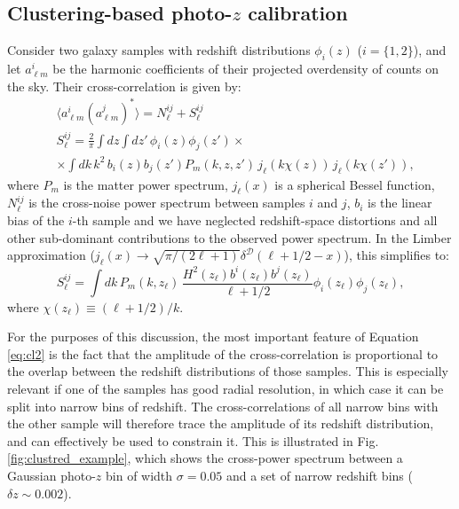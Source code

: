 \documentclass[prd,twocolumn]{revtex4}
\begin{document}
  \subsection{Clustering-based photo-$z$ calibration}\label{ssec:method.clustred}
    Consider two galaxy samples with redshift distributions $\phi_i(z)$ ($i=\{1,2\}$),
    and let $a^i_{\ell m}$ be the harmonic coefficients of their projected overdensity
    of counts on the sky. Their cross-correlation is given by:
    \begin{align}
      &\langle a^i_{\ell m}(a^j_{\ell m})^*\rangle=N^{ij}_\ell+S^{ij}_\ell\\\label{eq:cl1}
      &S^{ij}_\ell=\frac{2}{\pi}\int dz \int dz'\,\phi_i(z)\phi_j(z')\times\\\nonumber
      &\times\int dk\,k^2\,b_i(z)b_j(z')P_m(k,z,z')\,j_\ell(k\chi(z))\,j_\ell(k\chi(z')),
    \end{align}
    where $P_m$ is the matter power spectrum, $j_\ell(x)$ is a spherical Bessel function,
    $N^{ij}_\ell$ is the cross-noise power spectrum between samples $i$ and $j$, $b_i$
    is the linear bias of the $i$-th sample and we have neglected redshift-space distortions
    and all other sub-dominant contributions to the observed power spectrum. In the Limber
    approximation ($j_\ell(x)\rightarrow\sqrt{\pi/(2\ell+1)}\delta^\mathcal{D}(\ell+1/2-x)$),
    this simplifies to:
    \begin{equation}\label{eq:cl2}
      S^{ij}_\ell=\int dk\,P_m(k,z_\ell)\,\frac{H^2(z_\ell)b^i(z_\ell)b^j(z_\ell)}{\ell+1/2}
      \phi_i(z_\ell)\phi_j(z_\ell),
    \end{equation}
    where $\chi(z_\ell)\equiv(\ell+1/2)/k$.

    For the purposes of this discussion, the most important feature of Equation \ref{eq:cl2}
    is the fact that the amplitude of the cross-correlation is proportional to the overlap
    between the redshift distributions of those samples. This is especially relevant if one
    of the samples has good radial resolution, in which case it can be split into narrow bins
    of redshift. The cross-correlations of all narrow bins with the other sample will
    therefore trace the amplitude of its redshift distribution, and can effectively be used
    to constrain it. This is illustrated in Fig. \ref{fig:clustred_example}, which shows the
    cross-power spectrum between a Gaussian photo-$z$ bin of width $\sigma=0.05$ and a set
    of narrow redshift bins ($\delta z\sim0.002$).
\end{document}

